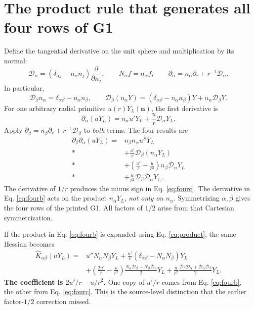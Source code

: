 \documentclass[11pt]{article}
\begin{document}
\section{The product rule that generates all four rows of G1}
Define the tangential derivative on the unit sphere and multiplication by its normal:
\begin{equation}
 \mathcal D_\alpha=(\delta_{\alpha j}-n_\alpha n_j)\frac{\partial}{\partial n_j},\qquad
 N_\alpha f=n_\alpha f,\qquad
 \partial_\alpha=n_\alpha\partial_r+r^{-1}\mathcal D_\alpha.
\end{equation}
In particular,
\begin{equation}\label{eq:product}
 \mathcal D_\beta n_\alpha=\delta_{\alpha\beta}-n_\alpha n_\beta,\qquad
 \mathcal D_\beta(n_\alpha Y)=(\delta_{\alpha\beta}-n_\alpha n_\beta)Y+n_\alpha\mathcal D_\beta Y.
\end{equation}
For one arbitrary radial primitive $u(r)Y_L(\bm n)$, the first derivative is
\begin{equation}
 \partial_\alpha(uY_L)=n_\alpha u'Y_L+\frac{u}{r}\mathcal D_\alpha Y_L.
\end{equation}
Apply $\partial_\beta=n_\beta\partial_r+r^{-1}\mathcal D_\beta$ to \emph{both} terms. The four results are
\begin{subequations}\label{eq:four}
\begin{align}
 \partial_\beta\partial_\alpha(uY_L)
 ={}&n_\beta n_\alpha u''Y_L\label{eq:foura}\\*
 &+\frac{u'}r\mathcal D_\beta(n_\alpha Y_L)\label{eq:fourb}\\*
 &+\left(\frac{u'}r-\frac{u}{r^2}\right)n_\beta\mathcal D_\alpha Y_L\label{eq:fourc}\\*
 &+\frac{u}{r^2}\mathcal D_\beta\mathcal D_\alpha Y_L.\label{eq:fourd}
\end{align}
\end{subequations}
The derivative of $1/r$ produces the minus sign in Eq. \eqref{eq:fourc}. The derivative in Eq. \eqref{eq:fourb} acts on the product $n_\alpha Y_L$, \emph{not only on $n_\alpha$}. Symmetrizing $\alpha,\beta$ gives the four rows of the printed G1. All factors of $1/2$ arise from that Cartesian symmetrization.

If the product in Eq. \eqref{eq:fourb} is expanded using Eq. \eqref{eq:product}, the same Hessian becomes
\begin{align}\label{eq:regroup}
 \hat K_{\alpha\beta}(uY_L)={}&u''N_\alpha N_\beta Y_L
 +\frac{u'}r(\delta_{\alpha\beta}-N_\alpha N_\beta)Y_L\nonumber\\
 &+\left(\frac{2u'}r-\frac{u}{r^2}\right)
 \frac{N_\alpha\mathcal D_\beta+N_\beta\mathcal D_\alpha}{2}Y_L
 +\frac{u}{r^2}\frac{\mathcal D_\beta\mathcal D_\alpha+\mathcal D_\alpha\mathcal D_\beta}{2}Y_L.
\end{align}
\textbf{The coefficient is $2u'/r-u/r^2$.} One copy of $u'/r$ comes from Eq. \eqref{eq:fourb}, the other from Eq. \eqref{eq:fourc}. This is the source-level distinction that the earlier factor-$1/2$ correction missed.
\end{document}
